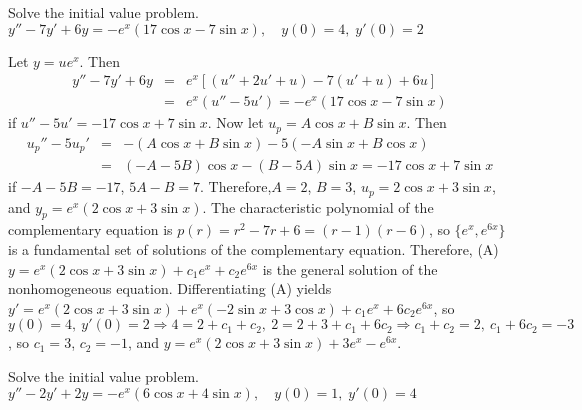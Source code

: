 \documentclass{ximera}
\begin{document}
\begin{problem}\label{exer:5.5.22}
 Solve the
initial value problem. $y''-7y'+6y=-e^x(17\cos x-7\sin x), \quad   y(0)=4,\;  y'(0)=2$

\begin{solution}
    Let $y=ue^x$. Then
\begin{eqnarray*}
y''-7y'+6y&=&e^x\left[(u''+2u'+u)-7(u'+u)+6u\right]\\ &=&e^x(u''-5u')=
-e^x(17\cos x-7\sin x)
\end{eqnarray*}
 if $u''-5u'=-17\cos x+7\sin x$.
Now let  $u_p=A\cos x+B\sin x$. Then
\begin{eqnarray*}
u_p''-5u_p'&=&-(A\cos x+B\sin x)-5(-A\sin x+B\cos x)\\
&=& (-A-5B)\cos x-(B-5A)\sin x=-17\cos x+7\sin x
\end{eqnarray*}
if $-A-5B=-17$, $5A-B=7$. Therefore,$A=2$, $B=3$, $u_p=2\cos x+3\sin
x$, and $y_p=e^x(2\cos x+3\sin x)$. The characteristic polynomial of
the complementary equation is $p(r)=r^2-7r+6=(r-1)(r-6)$, so
$\{e^x,e^{6x}\}$ is a fundamental set of solutions of the
complementary equation. Therefore,
(A) $y=e^x(2\cos x+3\sin x)+c_1e^x+c_2e^{6x}$
is the general solution of the nonhomogeneous
equation. Differentiating (A) yields
$y'=e^x(2\cos x+3\sin x)+e^x(-2\sin x+3\cos x)+c_1e^x+6c_2e^{6x}$,
so $y(0)=4,\ y'(0)=2\Rightarrow 4=2+c_1+c_2,\
2=2+3+c_1+6c_2\Rightarrow c_1+c_2=2,\ c_1+6c_2=-3$, so $c_1=3$,
$c_2=-1$, and
 $y=e^x(2\cos x+3\sin x)+3e^x-e^{6x}$.
\end{solution}
\end{problem}

\begin{problem}\label{exer:5.5.23}
Solve the
initial value problem. $y''-2y'+2y=-e^x(6\cos x+4\sin x), \quad   y(0)=1,\;  y'(0)=4$
\end{problem}
\end{document}
